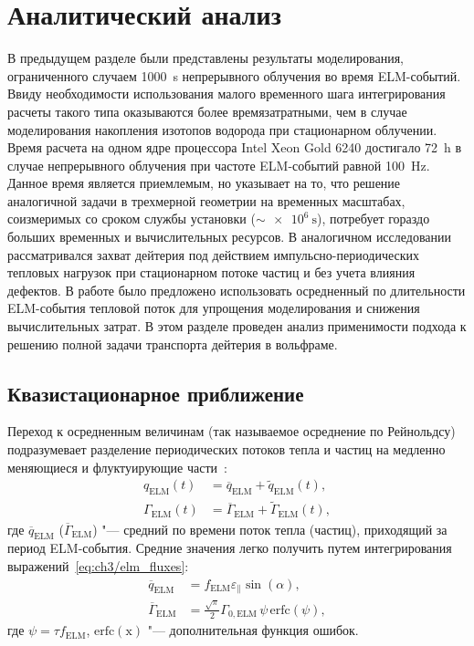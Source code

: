\section{Аналитический анализ}\label{sec:ch3/sec3}

В предыдущем разделе были представлены результаты моделирования, ограниченного случаем \SI{1000}{\second} непрерывного облучения во время ELM-событий. Ввиду необходимости использования малого временного шага интегрирования расчеты такого типа оказываются более времязатратными, чем в случае моделирования накопления изотопов водорода при стационарном облучении. Время расчета на одном ядре процессора Intel Xeon Gold 6240 достигало \SI{72}{\hour} в случае непрерывного облучения при частоте ELM-событий равной \SI{100}{\hertz}. Данное время является приемлемым, но указывает на то, что решение аналогичной задачи в трехмерной геометрии на временных масштабах, соизмеримых со сроком службы установки (\( \sim \SI{e6}{\second}\)), потребует гораздо больших временных и вычислительных ресурсов. В аналогичном исследовании~\cite{Dasgupta2023} рассматривался захват дейтерия под действием импульсно-периодических тепловых нагрузок при стационарном потоке частиц и без учета влияния дефектов. В работе было предложено использовать осредненный по длительности ELM-события тепловой поток для упрощения моделирования и снижения вычислительных затрат. В этом разделе проведен анализ применимости подхода к решению полной задачи транспорта дейтерия в вольфраме.

\subsection{Квазистационарное приближение}
Переход к осредненным величинам (так называемое осреднение по Рейнольдсу) подразумевает разделение периодических потоков тепла и частиц на медленно меняющиеся и флуктуирующие части~\cite{Marenkov2012a}:
\begin{subequations}
	\label{eq:ch3/periodic_funcs}
	\begin{align}
		q_{\mathrm{ELM}}(t)&=\overline{q}_{\mathrm{ELM}} + \widetilde{q}_{\mathrm{ELM}}(t),\label{eq:decomp_heat}\\
		\Gamma_{\mathrm{ELM}}(t)&=\overline{\Gamma}_{\mathrm{ELM}} + \widetilde{\Gamma}_{\mathrm{ELM}}(t),
	\end{align}
\end{subequations}
где $\overline{q}_{\mathrm{ELM}}$ ($\overline{\Gamma}_{\mathrm{ELM}}$) "--- средний по времени поток тепла (частиц), приходящий за период ELM-события. Средние значения легко получить путем интегрирования выражений~\cref{eq:ch3/elm_fluxes}:
\begin{subequations}
	\label{eq:ch3/av_funcs}
	\begin{align}
		\overline{q}_{\mathrm{ELM}}&=f_{\mathrm{ELM}}\varepsilon_\parallel\sin(\alpha)\label{eq:av_heat},\\
		\overline{\Gamma}_{\mathrm{ELM}}& =\frac{\sqrt{\pi}}{2} \Gamma_{0,\mathrm{ELM}}\,\psi\,\mathrm{erfc}\left(\psi\right),\label{eq:av_flux}
	\end{align}
\end{subequations}
где $\psi=\tau f_{\mathrm{ELM}}$, $\mathrm{erfc(x)}$ "--- дополнительная функция ошибок.

